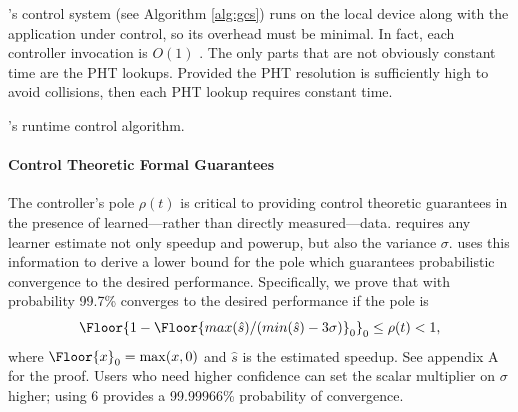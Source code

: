 \SYSTEM{}'s control system (see Algorithm \ref{alg:gcs}) runs on the
local device along with the application under control, so its overhead
must be minimal.  In fact, each controller invocation is $O(1)$ .  The
only parts that are not obviously constant time are the PHT lookups.
Provided the PHT resolution is sufficiently high to avoid collisions,
then each PHT lookup requires constant time.
\begin{algorithm}[t]
\caption{\SYSTEM{}'s runtime control algorithm.}
\label{alg:gcs}
\end{algorithm}

\paragraph{Control Theoretic Formal Guarantees}

The controller's pole $\rho(t)$ is critical to providing control
theoretic guarantees in the presence of learned---rather than directly
measured---data.  \SYSTEM{} requires any learner estimate not only
speedup and powerup, but also the variance $\sigma$.  \SYSTEM{} uses
this information to derive a lower bound for the pole which guarantees
probabilistic convergence to the desired performance. Specifically, we
prove that with probability 99.7\% \SYSTEM{} converges to the desired
performance if the pole is
$$\Floor{1- \Floor{max(\hat{s})/(min(\hat{s}) - 3\sigma)}_0}_0 \leq \rho(t)
< 1,$$ where $\Floor{x}_0 = \max(x,0)$ and $\hat{s}$ is the estimated
speedup. See appendix A for the proof. Users who need higher
confidence can set the scalar multiplier on $\sigma$ higher; \eg{}
using $6$ provides a 99.99966\% probability of convergence.

